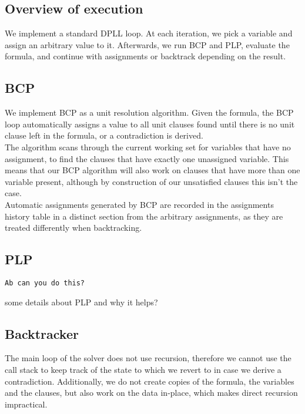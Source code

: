 \documentclass[a4paper]{article}
\begin{document}
\subsection{Overview of execution}

We implement a standard DPLL loop. At each iteration, we pick a variable and assign an arbitrary value to it. Afterwards, we run BCP and PLP, evaluate the formula, and continue with assignments or backtrack depending on the result.\\

\subsection{BCP}

We implement BCP as a unit resolution algorithm. Given the formula, the BCP loop automatically assigns a value to all unit clauses found until there is no unit clause left in the formula, or a contradiction is derived.\\

The algorithm scans through the current working set for variables that have no assignment, to find the clauses that have exactly one unassigned variable. This means that our BCP algorithm will also work on clauses that have more than one variable present, although by construction of our unsatisfied clauses this isn't the case.\\

Automatic assignments generated by BCP are recorded in the assignments history table in a distinct section from the arbitrary assignments, as they are treated differently when backtracking.\\

\subsection{PLP}

\texttt{Ab can you do this?}

some details about PLP and why it helps?

\subsection{Backtracker}

The main loop of the solver does not use recursion, therefore we cannot use the call stack to keep track of the state to which we revert to in case we derive a contradiction. Additionally, we do not create copies of the formula, the variables and the clauses, but also work on the data in-place, which makes direct recursion impractical.\\
\end{document}
